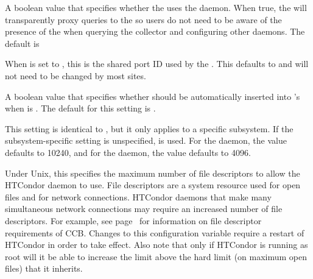 \begin{description}
\label{param:CollectorUsesSharedPort}
\item[\Macro{COLLECTOR\_USES\_SHARED\_PORT}] A boolean value that
  specifies whether the  uses the 
  daemon.  When true, the  will transparently
  proxy queries to the  so users do not need to be aware of
  the presence of the  when querying the collector
  and configuring other daemons.  The default is 

\label{param:SharedPortDefaultId}
\item[\Macro{SHARED\_PORT\_DEFAULT\_ID}] When 
  is set to , this is the shared port ID used by the .
  This defaults to  and will not need to be changed by most sites.

\label{param:AutoIncludeSharedPortInDaemonList}
\item[\Macro{AUTO\_INCLUDE\_SHARED\_PORT\_IN\_DAEMON\_LIST}] A boolean
  value that specifies whether  should be
  automatically inserted into 's 
  when  is .  The default for this
  setting is .

\label{param:SubsysMaxFileDescriptors}
\item[\MacroB{<SUBSYS>\_MAX\_FILE\_DESCRIPTORS}]
This setting is identical to , but it
only applies to a specific subsystem.  If the
subsystem-specific setting is unspecified, 
is used.
For the  daemon, the value defaults to 10240, and
for the  daemon, the value defaults to 4096.

\label{param:MaxFileDescriptors}
\item[\Macro{MAX\_FILE\_DESCRIPTORS}] Under Unix, this specifies the
maximum number of file descriptors to allow the HTCondor daemon to use.
File descriptors are a system resource used for open files and for
network connections.  HTCondor daemons that make many simultaneous
network connections may require an increased number of file
descriptors.  For example, see page~\pageref{sec:CCB} for information
on file descriptor requirements of CCB.  Changes to this configuration
variable require a restart of HTCondor in order to take effect.  Also note
that only if HTCondor is running as root will it be able to increase the
limit above the hard limit (on maximum open files) that it inherits.


\end{description}

